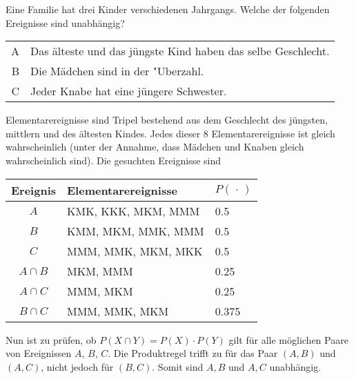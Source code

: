 Eine Familie hat drei Kinder verschiedenen Jahrgangs. Welche der
folgenden Ereignisse sind unabhängig?

\begin{tabular}{rl}
A & Das älteste und das jüngste Kind haben das selbe Geschlecht.\\
B & Die Mädchen sind in der "Uberzahl.\\
C & Jeder Knabe hat eine jüngere Schwester.
\end{tabular}

\begin{loesung}
Elementarereignisse sind Tripel bestehend aus dem Geschlecht
des jüngsten, mittlern und des ältesten Kindes.
Jedes dieser 8 Elementarereignisse ist gleich wahrscheinlich (unter
der Annahme, dass Mädchen und Knaben gleich wahrscheinlich sind). Die
gesuchten Ereignisse sind
\begin{center}
\begin{tabular}{|c|l|l|}
\hline
Ereignis&Elementarereignisse&$P(\,\cdot\,)$\\
\hline
$A$&KMK, KKK, MKM, MMM&0.5\\
$B$&KMM, MKM, MMK, MMM&0.5\\
$C$&MMM, MMK, MKM, MKK&0.5\\
\hline
$A\cap B$&MKM, MMM&0.25\\
$A\cap C$&MMM, MKM&0.25\\
$B\cap C$&MMM, MMK, MKM&0.375\\
\hline
\end{tabular}
\end{center}
Nun ist zu prüfen, ob $P(X\cap Y)=P(X)\cdot P(Y)$ gilt für alle
möglichen Paare von Ereignissen $A$, $B$, $C$.
Die Produktregel trifft zu für
das Paar $(A,B)$ und $(A,C)$, nicht jedoch für $(B,C)$.
Somit sind $A,B$ und $A,C$ unabhängig.
\end{loesung}

